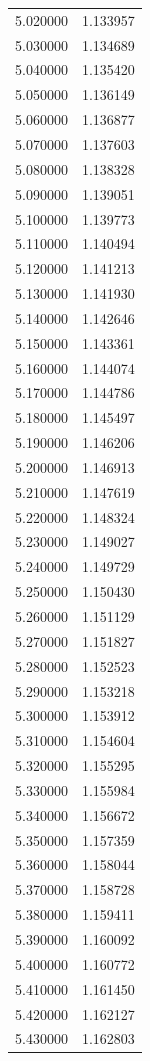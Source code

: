 \begin{tabular}{rr}
5.020000 & 1.133957 \\
5.030000 & 1.134689 \\
5.040000 & 1.135420 \\
5.050000 & 1.136149 \\
5.060000 & 1.136877 \\
5.070000 & 1.137603 \\
5.080000 & 1.138328 \\
5.090000 & 1.139051 \\
5.100000 & 1.139773 \\
5.110000 & 1.140494 \\
5.120000 & 1.141213 \\
5.130000 & 1.141930 \\
5.140000 & 1.142646 \\
5.150000 & 1.143361 \\
5.160000 & 1.144074 \\
5.170000 & 1.144786 \\
5.180000 & 1.145497 \\
5.190000 & 1.146206 \\
5.200000 & 1.146913 \\
5.210000 & 1.147619 \\
5.220000 & 1.148324 \\
5.230000 & 1.149027 \\
5.240000 & 1.149729 \\
5.250000 & 1.150430 \\
5.260000 & 1.151129 \\
5.270000 & 1.151827 \\
5.280000 & 1.152523 \\
5.290000 & 1.153218 \\
5.300000 & 1.153912 \\
5.310000 & 1.154604 \\
5.320000 & 1.155295 \\
5.330000 & 1.155984 \\
5.340000 & 1.156672 \\
5.350000 & 1.157359 \\
5.360000 & 1.158044 \\
5.370000 & 1.158728 \\
5.380000 & 1.159411 \\
5.390000 & 1.160092 \\
5.400000 & 1.160772 \\
5.410000 & 1.161450 \\
5.420000 & 1.162127 \\
5.430000 & 1.162803 \\

\end{tabular}
